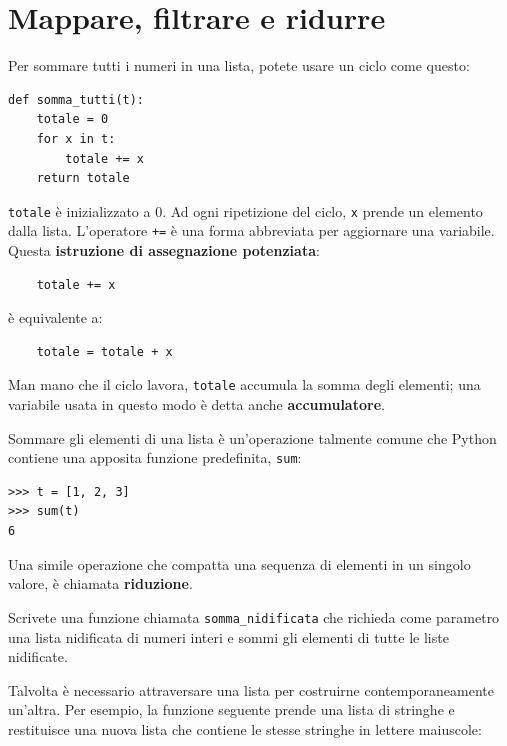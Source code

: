 \documentclass[10pt]{book}
\begin{document}
\section{Mappare, filtrare e ridurre}

Per sommare tutti i numeri in una lista, potete usare un ciclo come questo:


\begin{verbatim}
def somma_tutti(t):
    totale = 0
    for x in t:
        totale += x
    return totale
\end{verbatim}
%
{\tt totale} è inizializzato a 0. Ad ogni ripetizione del ciclo,
{\tt x} prende un elemento dalla lista. L'operatore {\tt +=} è una forma abbreviata per aggiornare una variabile. Questa
{\bf istruzione di assegnazione potenziata}:

\begin{verbatim}
    totale += x
\end{verbatim}
%
è equivalente a:

\begin{verbatim}
    totale = totale + x
\end{verbatim}
%
Man mano che il ciclo lavora, {\tt totale} accumula la somma degli elementi; una variabile usata in questo modo è detta anche {\bf accumulatore}.

Sommare gli elementi di una lista è un'operazione talmente comune che Python contiene una apposita funzione predefinita, {\tt sum}:

\begin{verbatim}
>>> t = [1, 2, 3]
>>> sum(t)
6
\end{verbatim}
%
Una simile operazione che compatta una sequenza di elementi in un singolo valore, è chiamata {\bf riduzione}.

\vspace{0.2in}
\begin{exercise}

Scrivete una funzione chiamata \verb"somma_nidificata" che richieda come parametro una lista nidificata di numeri interi e sommi gli elementi di tutte le liste nidificate.

\end{exercise}

Talvolta è necessario attraversare una lista per costruirne contemporaneamente un'altra. Per esempio, la funzione seguente prende una lista di stringhe e restituisce una nuova lista che contiene le stesse stringhe in lettere maiuscole:
\end{document}
